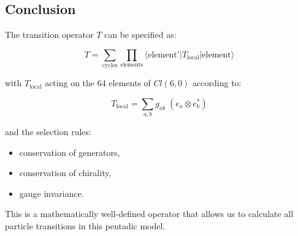 \documentclass[11pt]{article}
\providecommand{\tightlist}{%
\setlength{\itemsep}{2pt}\setlength{\parskip}{6pt}
}
\begin{document}
\hypertarget{conclusion-2}{%
\subsection{Conclusion}\label{conclusion-2}}

The transition operator \(T\) can be specified as:

\[
T = \sum_{\text{cycles}} \prod_{\text{elements}} \langle \text{element}' | T_{\text{local}} | \text{element} \rangle
\]

with \(T_{\text{local}}\) acting on the 64 elements of \(Cl(6,0)\)
according to:

\[
T_{\text{local}} = \sum_{a,b} g_{ab}\; (e_a \otimes e_b^*)
\]

and the selection rules:

\begin{itemize}
\tightlist
\item
  conservation of generators,
\item
  conservation of chirality,
\item
  gauge invariance.
\end{itemize}

This is a mathematically well-defined operator that allows us to
calculate all particle transitions in this pentadic model.
\end{document}
